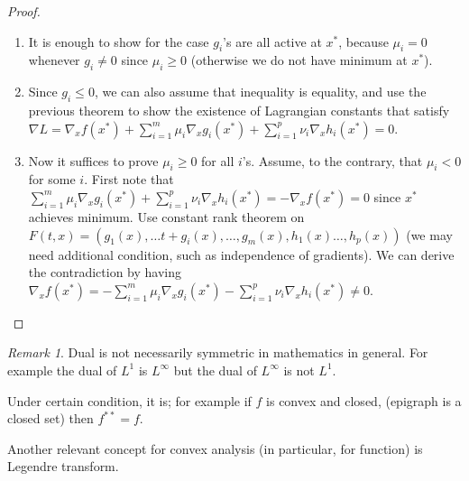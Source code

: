 \documentclass{article}
\theoremstyle{remark}
\newtheorem{remark}[example]{Remark}
\begin{document}
\begin{proof}
\begin{enumerate}
\item It is enough to show for the case $g_i$'s are all active at $x^*$, because
 $\mu_i=0$ whenever $g_i\neq 0$ since $\mu_i\geq 0$ (otherwise we do not have minimum at $x^*$).
\item Since $g_i\leq 0$, we can also assume that inequality is equality, 
and use the previous theorem to show the existence of Lagrangian constants that satisfy $\nabla L=\nabla_x f(x^*)+\sum^m_{i=1}\mu_i\nabla_x g_i(x^*)+\sum^p_{i=1}\nu_i\nabla_x h_i(x^*)=0$.
\item Now it suffices to prove $\mu_i\geq 0$ for all $i$'s. Assume, to the contrary, that $\mu_i<0$ for some $i$.
First note that $\sum^m_{i=1}\mu_i\nabla_x g_i(x^*)+\sum^p_{i=1}\nu_i\nabla_x h_i(x^*)=-\nabla_x f(x^*)=0$ since $x^*$ achieves minimum. 
Use constant rank theorem on $F(t,x)=(g_1(x),\dots t+g_i(x),\dots, g_m(x),h_1(x)\dots,h_p(x))$ (we may need additional condition, such as independence of gradients). 
We can derive the contradiction by having $\nabla_x f(x^*)=-\sum^m_{i=1}\mu_i\nabla_xg_i(x^*)-\sum^p_{i=1}\nu_i\nabla_x h_i(x^*)\neq 0$.
\end{enumerate}
\end{proof}
\begin{remark}
\item Dual is not necessarily symmetric in mathematics in general. For example the dual of $L^1$ is $L^\infty$ but the dual of $L^\infty$ is not $L^1$.
\item Under certain condition, it is; for example if $f$ is convex and closed, (epigraph is a closed set) then $f^{**}=f$.
\item Another relevant concept for convex analysis (in particular, for function) is Legendre transform.
\end{remark}
\end{document}
